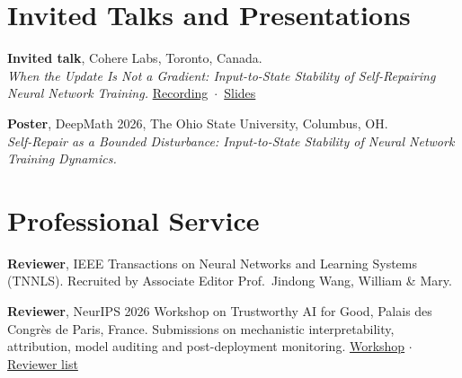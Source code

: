 \documentclass[10pt,a4paper]{article}
\newcommand{\cvitem}[3]{%
  \begin{list}{}{%
    \setlength{\leftmargin}{2.35cm}%
    \setlength{\labelwidth}{2.1cm}%
    \setlength{\labelsep}{0.25cm}%
    \setlength{\itemindent}{0pt}%
    \setlength{\listparindent}{0pt}%
    \setlength{\rightmargin}{0pt}%
    \setlength{\topsep}{0pt}%
    \setlength{\partopsep}{0pt}%
    \setlength{\parsep}{0pt}%
    \setlength{\itemsep}{0pt}%
  }%
  \item[{\makebox[2.1cm][l]{\footnotesize\color{muted}#1}}]%
  #2
  #3
  \end{list}%
  \vspace{1pt}
}
\begin{document}
\section*{Invited Talks and Presentations}
\cvitem{Nov 2026}{%
  \textbf{Invited talk}, Cohere Labs, Toronto, Canada.\\
  {\small\textit{When the Update Is Not a Gradient: Input-to-State Stability of Self-Repairing Neural Network Training.} \mbox{\href{https://www.youtube.com/watch?v=R75wEi3Ti-M}{Recording} $\cdot$ \href{https://www.raadh.me/assets/pdf/Raadh_CohereLabs_2026_When_the_Update_Is_Not_a_Gradient.pdf}{Slides}}}
}{}
\cvitem{Oct 2026}{%
  \textbf{Poster}, DeepMath 2026, The Ohio State University, Columbus, OH.\\
  {\small\textit{Self-Repair as a Bounded Disturbance: Input-to-State Stability of Neural Network Training Dynamics.}}
}{}

\section*{Professional Service}
\cvitem{2026}{%
  \textbf{Reviewer}, IEEE Transactions on Neural Networks and Learning Systems (TNNLS). Recruited by Associate Editor Prof.~Jindong Wang, William \& Mary.
}{}
\cvitem{2026}{%
  \textbf{Reviewer}, NeurIPS 2026 Workshop on Trustworthy AI for Good, Palais des Congr\`es de Paris, France. Submissions on mechanistic interpretability, attribution, model auditing and post-deployment monitoring. \href{https://trustworthy-ai-for-good.github.io/}{Workshop} $\cdot$ \href{https://trustworthy-ai-for-good.github.io/\#reviewers}{Reviewer list}
}{}
\end{document}
